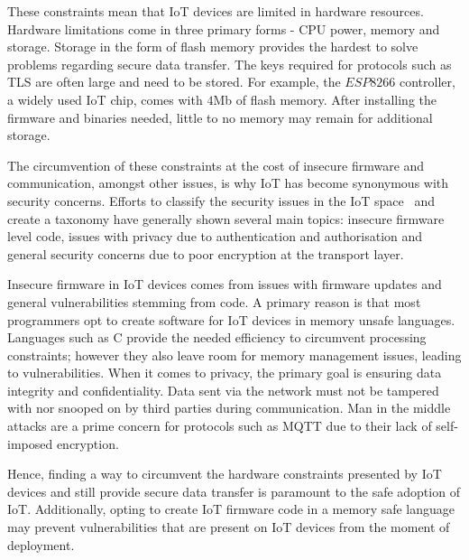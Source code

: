 These constraints mean that IoT devices are limited in hardware resources.
Hardware limitations come in three primary forms - CPU power, memory and storage.
Storage in the form of flash memory provides the hardest to solve problems regarding secure data transfer.
The keys required for protocols such as TLS are often large and need to be stored.
For example, the $ESP8266$ controller, a widely used IoT chip, comes with $4$Mb of flash memory.
After installing the firmware and binaries needed, little to no memory may remain for additional storage.

The circumvention of these constraints at the cost of insecure firmware and communication, amongst other issues, is why IoT has become synonymous with security concerns.
Efforts to classify the security issues in the IoT space~\citep{alaba_internet_2017,gupta_security_2021,swamy_security_2017} and create a taxonomy have generally shown several main topics: insecure firmware level code, issues with privacy due to authentication and authorisation and general security concerns due to poor encryption at the transport layer.

Insecure firmware in IoT devices comes from issues with firmware updates and general vulnerabilities stemming from code.
A primary reason is that most programmers opt to create software for IoT devices in memory unsafe languages.
Languages such as C provide the needed efficiency to circumvent processing constraints; however they also leave room for memory management issues, leading to vulnerabilities.
When it comes to privacy, the primary goal is ensuring data integrity and confidentiality.
Data sent via the network must not be tampered with nor snooped on by third parties during communication.
Man in the middle attacks are a prime concern for protocols such as MQTT due to their lack of self-imposed encryption.

Hence, finding a way to circumvent the hardware constraints presented by IoT devices and still provide secure data transfer is paramount to the safe adoption of IoT.
Additionally, opting to create IoT firmware code in a memory safe language may prevent vulnerabilities that are present on IoT devices from the moment of deployment.
